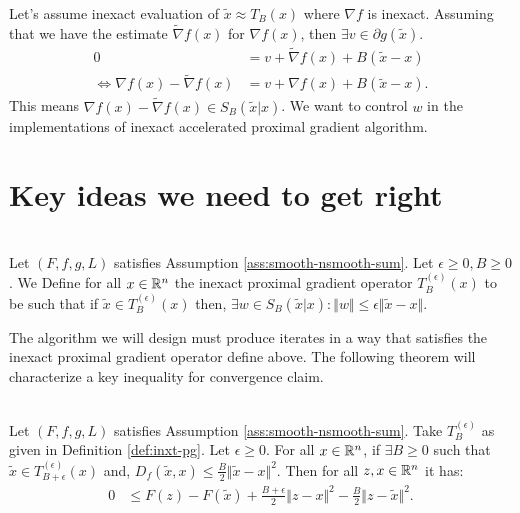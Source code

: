 \documentclass[12pt]{article}
\begin{document}
    Let's assume inexact evaluation of $\tilde x \approx T_B(x)$ where $\nabla f$ is inexact. 
    Assuming that we have the estimate $\tilde \nabla f(x)$ for $\nabla f(x)$, then $\exists v \in \partial g(\tilde x)$. 
    \begin{align*}
        0 &= v + \tilde \nabla f(x) + B(\tilde x - x)
        \\
        \iff
        \nabla f(x) - \tilde \nabla f(x)
        &= v + \nabla f(x) + B(\tilde x - x). 
    \end{align*}
    This means $\nabla f(x) - \tilde \nabla f(x) \in S_B(\tilde x | x)$. 
    We want to control $w$ in the implementations of inexact accelerated proximal gradient algorithm.
    
\section{Key ideas we need to get right}
    \begin{definition}\;\label{def:inxt-pg}\\
        Let $(F, f, g, L)$ satisfies Assumption \ref{ass:smooth-nsmooth-sum}.
        Let $\epsilon \ge 0, B \ge 0$. 
        We Define for all $x \in \mathbb R^n$ the inexact proximal gradient operator $T_B^{(\epsilon)}(x)$ to be such that if $\tilde x \in T^{(\epsilon)}_{B}(x)$ then, $\exists w \in S_{B}(\tilde x | x):\Vert w\Vert\le \epsilon \Vert \tilde x - x\Vert$.         
    \end{definition}
    The algorithm we will design must produce iterates in a way that satisfies the inexact proximal gradient operator define above. 
    The following theorem will characterize a key inequality for convergence claim. 
    \begin{theorem}\;\label{thm:inxt-pg-ineq}\\
        Let $(F, f, g, L)$ satisfies Assumption \ref{ass:smooth-nsmooth-sum}.
        Take $T^{(\epsilon)}_B$ as given in Definition \ref{def:inxt-pg}. 
        Let $\epsilon \ge 0$. 
        For all $x\in \mathbb R^n$, if $\exists B \ge 0$ such that $\tilde x \in T_{B + \epsilon}^{(\epsilon)}(x)$ and, $D_f(\tilde x, x)\le \frac{B}{2}\Vert \tilde x - x\Vert^2$. 
        Then for all $z, x \in \mathbb R^n$ it has: 
        \begin{align*}
            0 &\le F(z) - F(\tilde x) + \frac{B + \epsilon}{2}\Vert z - x\Vert^2
            - \frac{B}{2}\Vert z - \tilde x\Vert^2. 
        \end{align*}
    \end{theorem}
\end{document}
